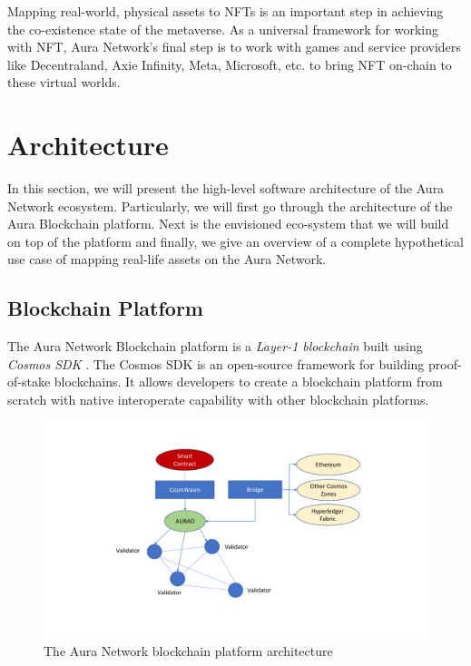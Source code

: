 \documentclass[12pt, titlepage]{article}
\begin{document}
Mapping real-world, physical assets to NFTs is an important step in achieving the co-existence state of the metaverse. As a universal framework for working with NFT, Aura Network's final step is to work with games and service providers like Decentraland, Axie Infinity, Meta, Microsoft, etc. to bring NFT on-chain to these virtual worlds.

\section{Architecture}
In this section, we will present the high-level software architecture of the Aura Network ecosystem. Particularly, we will first go through the architecture of the Aura Blockchain platform. Next is the envisioned eco-system that we will build on top of the platform and finally, we give an overview of a complete hypothetical use case of mapping real-life assets on the Aura Network.

\subsection{Blockchain Platform}
The Aura Network Blockchain platform is a \emph{Layer-1 blockchain} built using \emph{Cosmos SDK} \cite{kwon2019cosmos}. The Cosmos SDK is an open-source framework for building proof-of-stake blockchains. It allows developers to create a blockchain platform from scratch with native interoperate capability with other blockchain platforms. 

\begin{figure}[ht]
\label{fig:architecture}
\includegraphics[width=\textwidth, trim={5cm 2cm 5cm 0}, clip]{img/architecture.pdf}
\centering
\caption{The Aura Network blockchain platform architecture}
\end{figure}
\end{document}
